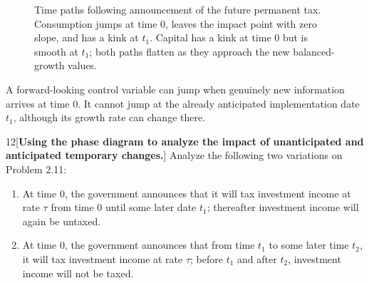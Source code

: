 \begin{solution}
\begin{figure}[H]
    \caption{Time paths following announcement of the future permanent tax.
    Consumption jumps at time 0, leaves the impact point with zero slope,
    and has a kink at \(t_1\). Capital has a kink at time 0 but is smooth at
    \(t_1\); both paths flatten as they approach the new balanced-growth
    values.}
\end{figure}
\end{solution}

\begin{note}
    A forward-looking control variable can jump when genuinely new
    information arrives at time 0. It cannot jump at the already anticipated
    implementation date \(t_1\), although its growth rate can change there.
\end{note}

\begin{problem}{12}[\textbf{Using the phase diagram to analyze the impact of unanticipated and anticipated temporary changes.}]
Analyze the following two variations on Problem 2.11:
\begin{enumerate}[label=(\alph*)]
    \item At time 0, the government announces that it will tax investment income at rate \(\tau\) from time 0 until some later date \(t_1\); thereafter investment income will again be untaxed.
    \item At time 0, the government announces that from time \(t_1\) to some later time \(t_2\), it will tax investment income at rate \(\tau\); before \(t_1\) and after \(t_2\), investment income will not be taxed.
\end{enumerate}
\end{problem}

